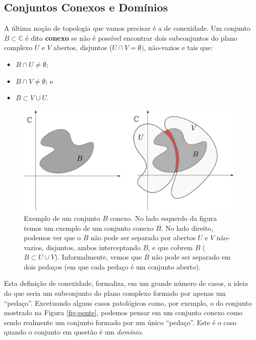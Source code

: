 \subsection{Conjuntos Conexos e Domínios}
\label{subsec-coonj-conexos-dominios}

A última noção de topologia que vamos precisar é a de conexidade. 
Um conjunto $B\subset \mathbb{C}$ é dito {\bf conexo} 
se não é possível encontrar dois subconjuntos do plano complexo $U$ e $V$ abertos, 
disjuntos ($U\cap V = \emptyset)$, não-vazios e tais que: 
\begin{itemize}
	\item $B\cap U\neq \emptyset$;  
	\item $B\cap V\neq \emptyset$; e
	\item $B\subset V\cup U$.
\end{itemize}

\begin{figure}[h]
\centering
\includegraphics[width=0.9\linewidth]{"Figuras/fig-conjuntos-conexos"}
\caption[Conjunto Conexo]{Exemplo de um conjunto $B$ conexo. No lado esquerdo da figura temos um exemplo de um conjunto conexo $B$. 
No lado direito, podemos ver que o $B$ não pode ser separado 
por abertos $U$ e $V$ não-vazios, disjuntos, ambos interceptando $B$, e que cobrem $B$ ($B\subset U\cup V$).
Informalmente, vemos que $B$ não pode ser separado em dois pedaços (em que cada pedaço é um 
conjunto aberto). }
\label{fig:conjuntos-conexos}
\end{figure}


Esta definição de conexidade, formaliza, em um grande número de casos, a ideia do que seria 
um subconjunto do plano complexo formado por apenas um ``pedaço''. 
Excetuando alguns casos patológicos como, por exemplo, 
o do conjunto mostrado na Figura \ref{fig-pente}, podemos pensar em um 
conjunto conexo como sendo realmente um conjunto formado por um único ``pedaço''. 
Este é o caso quando o conjunto em questão é um \textit{domínio}.  


